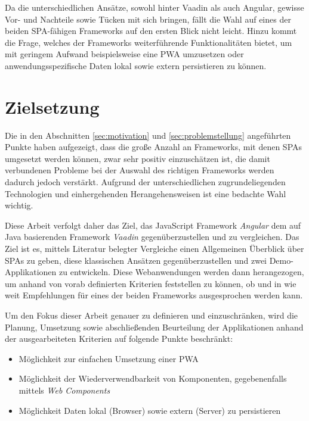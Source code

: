 \documentclass[a4paper,12pt,twoside]{scrreprt}
\begin{document}
\medskip

Da die unterschiedlichen Ansätze, sowohl hinter Vaadin als auch Angular, gewisse Vor- und Nachteile sowie Tücken mit sich bringen, fällt die Wahl auf eines der beiden \acs{SPA}-fähigen Frameworks auf den ersten Blick nicht leicht. Hinzu kommt die Frage, welches der Frameworks weiterführende Funktionalitäten bietet, um mit geringem Aufwand beispielsweise eine \ac{PWA} umzusetzen oder anwendungsspezifische Daten lokal sowie extern persistieren zu können.

\section{Zielsetzung}
\label{sec:zielsetzung}
Die in den Abschnitten \ref{sec:motivation} und \ref{sec:problemstellung} angeführten Punkte haben aufgezeigt, dass die große Anzahl an Frameworks, mit denen \aclp{SPA} umgesetzt werden können, zwar sehr positiv einzuschätzen ist, die damit verbundenen Probleme bei der Auswahl des richtigen Frameworks werden dadurch jedoch verstärkt. Aufgrund der unterschiedlichen zugrundeliegenden Technologien und einhergehenden Herangehensweisen ist eine bedachte Wahl wichtig.

\newpage

Diese Arbeit verfolgt daher das Ziel, das JavaScript Framework \textit{Angular} dem auf Java basierenden Framework \textit{Vaadin} gegenüberzustellen und zu vergleichen. Das Ziel ist es, mittels Literatur belegter Vergleiche einen Allgemeinen Überblick über \aclp{SPA} zu geben, diese klassischen Ansätzen gegenüberzustellen und zwei Demo-Applikationen zu entwickeln. Diese Webanwendungen werden dann herangezogen, um anhand von vorab definierten Kriterien feststellen zu können, ob und in wie weit Empfehlungen für eines der beiden Frameworks ausgesprochen werden kann.

\medskip

Um den Fokus dieser Arbeit genauer zu definieren und einzuschränken, wird die Planung, Umsetzung sowie abschließenden Beurteilung der Applikationen anhand der ausgearbeiteten Kriterien auf folgende Punkte beschränkt:
\begin{itemize}
    \item Möglichkeit zur einfachen Umsetzung einer \acf{PWA}
    \item Möglichkeit der Wiederverwendbarkeit von Komponenten, gegebenenfalls mittels \textit{Web Components}
    \item Möglichkeit Daten lokal (Browser) sowie extern (Server) zu persistieren
\end{itemize}
\end{document}
